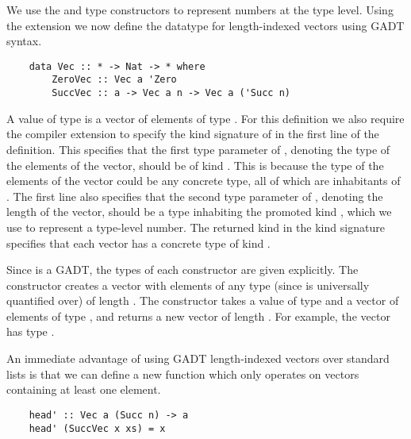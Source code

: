 
We use the  and  type constructors to represent numbers at the type level. Using the  extension we now define the datatype for length-indexed vectors using GADT syntax.

\begin{lstlisting}
    data Vec :: * -> Nat -> * where
        ZeroVec :: Vec a 'Zero
        SuccVec :: a -> Vec a n -> Vec a ('Succ n)
\end{lstlisting}
\cite{GADTs}


A value of type  is a vector of  elements of type . For this definition we also require the  compiler extension to specify the kind signature of  in the first line of the definition. This specifies that the first type parameter of , denoting the type of the elements of the vector, should be of kind \code{*}. This is because the type of the elements of the vector could be any concrete type, all of which are inhabitants of \code{*}. The first line also specifies that the second type parameter of , denoting the length of the vector, should be a type inhabiting the promoted kind , which we use to represent a type-level number. The returned kind \code{*} in the kind signature specifies that each vector has a concrete type of kind \code{*}.

Since  is a GADT, the types of each constructor are given explicitly. The  constructor creates a vector with elements of any type (since  is universally quantified over) of length . The  constructor takes a value of type  and a vector of  elements of type , and returns a new vector of length . For example, the vector  has type .

An immediate advantage of using GADT length-indexed vectors over standard lists is that we can define a new function  which only operates on vectors containing at least one element. 

\begin{lstlisting}
    head' :: Vec a (Succ n) -> a
    head' (SuccVec x xs) = x
\end{lstlisting}

